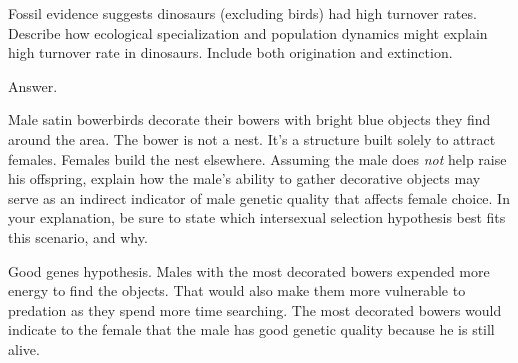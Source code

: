 \documentclass[12pt, addpoints]{exam}
\begin{document}
\begin{questions}
\newpage

\question
{}

\newpage



\question[15]
Fossil evidence suggests dinosaurs (excluding birds) had high turnover rates. Describe how ecological specialization and population dynamics might explain high turnover rate in dinosaurs. Include both origination and extinction.
	\begin{solution}
	Answer.
	\end{solution}	

\newpage

\question[15]
Male satin bowerbirds decorate their bowers with bright blue objects they find around the area. The bower is not a nest. It's a structure built solely to attract females. Females build the nest elsewhere. Assuming the male does \emph{not} help raise his offspring, explain how the male's ability to gather decorative objects may serve as an indirect indicator of male genetic quality that affects female choice. In your explanation, be sure to state which intersexual selection hypothesis best fits this scenario, and why.
	\begin{solution}
	Good genes hypothesis. Males with the most decorated bowers expended more energy to find the objects. That would also make them more vulnerable to predation as they spend more time searching. The most decorated bowers would indicate to the female that the male has good genetic quality because he is still alive.
	\end{solution}



\end{questions}
\end{document}
